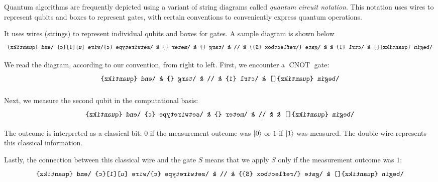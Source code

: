 \documentclass[a4paper, oneside, 12pt]{amsart}
\DeclareMathOperator{\CNOT}{CNOT}
\begin{document}
\begin{remark}\label{rmk:quantum-circuit-notation}
  Quantum algorithms are frequently depicted using a variant of string diagrams called \emph{quantum circuit notation}.
  This notation uses wires to represent qubits and boxes to represent gates, with certain conventions to conveniently express quantum operations.

  It uses wires (strings) to represent individual qubits and boxes for gates.
  A sample diagram is shown below
  \begin{equation*}
    \begin{tikzpicture}
      \node[xscale=-1]{
        \begin{quantikz}[]
          & \ctrl{1} &          &   \gate{\reflectbox{S}} &  \\
          & \targ{}  & \meter{} & \setwiretype{c}\wire[u][1]{c}
        \end{quantikz}
      };
    \end{tikzpicture}
  \end{equation*}
  We read the diagram, according to our convention, from right to left.
  First, we encounter a \(\CNOT\) gate:
  \begin{equation*}
    \begin{tikzpicture}
      \node[xscale=-1]{
        \begin{quantikz}[]
          & \ctrl{1} & \\
          & \targ{} &
        \end{quantikz}
      };
    \end{tikzpicture}
  \end{equation*}

  Next, we measure the second qubit in the computational basis:
  \begin{equation*}
    \begin{tikzpicture}
      \node[xscale=-1]{
        \begin{quantikz}[]
          &          &   \\
          & \meter{} & \setwiretype{c}
        \end{quantikz}
      };
    \end{tikzpicture}
  \end{equation*}
The outcome is interpreted as a classical bit: \(0\) if the measurement
outcome was \(\lvert0\rangle\) or \(1\) if \(\lvert1\rangle\) was measured.
The double wire represents this classical information.

Lastly, the connection between this classical wire and the gate \(S\) means that we apply \(S\) only if the measurement outcome was \(1\):
\begin{equation*}
    \begin{tikzpicture}
      \node[xscale=-1]{
        \begin{quantikz}[]
          &   \gate{\reflectbox{S}} &  \\
          & \setwiretype{c}\wire[u][1]{c}
        \end{quantikz}
      };
    \end{tikzpicture}
  \end{equation*}

\end{remark}
\end{document}
